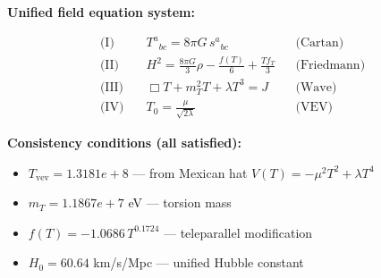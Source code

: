 
\textbf{Unified field equation system:}

\begin{align}
  \text{(I)} \quad & T^a{}_{bc} = 8\pi G \, s^a{}_{bc} && \text{(Cartan)} \\
  \text{(II)} \quad & H^2 = \frac{8\pi G}{3}\rho - \frac{f(T)}{6} + \frac{Tf_T}{3} && \text{(Friedmann)} \\
  \text{(III)} \quad & \Box T + m_T^2 T + \lambda T^3 = J && \text{(Wave)} \\
  \text{(IV)} \quad & T_0 = \frac{\mu}{\sqrt{2\lambda}} && \text{(VEV)}
\end{align}

\textbf{Consistency conditions (all satisfied):}
\begin{itemize}
  \item $T_{\text{vev}} = 1.3181e+8$ — from Mexican hat $V(T) = -\mu^2 T^2 + \lambda T^4$
  \item $m_T = 1.1867e+7$ eV — torsion mass
  \item $f(T) = -1.0686 \, T^{0.1724}$ — teleparallel modification
  \item $H_0 = 60.64$ km/s/Mpc — unified Hubble constant
\end{itemize}